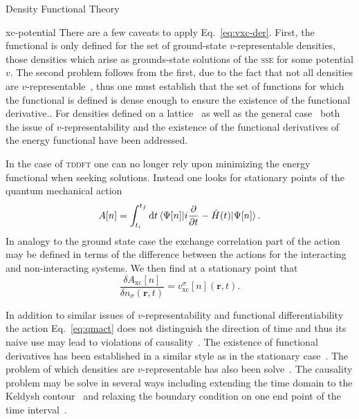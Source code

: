 \documentclass[letterpaper, 10 pt]{report}
\begin{document}
\begin{chapter}{Density Functional Theory \label{chap:dft}}
\begin{section}{xc-potential \label{sec:xcpot}}
      There are a few caveats to apply Eq.~\eqref{eq:vxc-der}. First, the functional is only defined
      for the set of ground-state $v$-representable densities, those densities which arise as
      grounds-state solutions of the \textsc{sse} for some potential $v$. The second problem follows
      from the first, due to the fact that not all densities are $v$-representable~\cite{not-vrep1,
      not-vrep2, not-vrep3}, thus one must establish that the set of functions for which the functional
      is defined is dense enough to ensure the existence of the functional derivative.. For densities
      defined on a lattice~\cite{vrep-lat} as well as the general case~\cite{nonint1, nonint2,
      vrep-levy1, vrep-levy2, vrep-lieb, vrep-rev} both the issue of $v$-representability and the
      existence of the functional derivatives of the energy functional have been addressed.

      In the case of \textsc{tddft} one can no longer rely upon minimizing the energy functional when
      seeking solutions. Instead one looks for stationary points of the quantum mechanical
      action~\cite{qmaction} 
      \begin{equation} \label{eq:qmact}
         A[n] = \int^{t_f}_{t_i} \mathrm{d}t
            \braket{\Psi[n] |i\frac{\partial}{\partial t} -\hat{H}(t) | \Psi[n]}.
      \end{equation}
      In analogy to the ground state case the exchange correlation part of the action may be defined in
      terms of the difference between the actions for the interacting and non-interacting systems. We
      then find at a stationary point that
      \begin{equation} \label{eq:tdvxc-der}
         \frac{\delta A_\mathrm{xc}[n]}{\delta n_\sigma(\mathbf{r},t)}
            = v^\sigma_\mathrm{xc}[n](\mathbf{r},t).
      \end{equation}

      In addition to similar issues of $v$-representability and functional differentiability the action
      Eq.~\eqref{eq:qmact} does not distinguish the direction of time and thus its naive use may lead
      to violations of causality~\cite{tddft-causality}. The existence of functional derivatives has
      been established in a similar style as in the stationary case~\cite{td-welldef}. The problem of
      which densities are $v$-representable has also been solve~\cite{td-vrep}. The causality problem
      may be solve in several ways including extending the time domain to the Keldysh
      contour~\cite{caus-sol1} and relaxing the boundary condition on one end point of the time
      interval~\cite{caus-sol2}.


\end{section}
\end{chapter}
\end{document}
